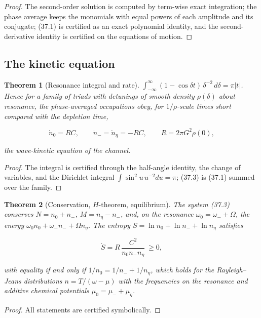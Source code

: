 \documentclass[11pt]{article}
\newtheorem{theorem}{Theorem}[section]
\theoremstyle{remark}
\begin{document}
\begin{proof}
The second-order solution is computed by term-wise exact
integration; the phase average keeps the monomials with equal
powers of each amplitude and its conjugate; (37.1) is certified as
an exact polynomial identity, and the second-derivative identity is
certified on the equations of motion.
\end{proof}

\subsection{The kinetic equation}

\begin{theorem}[Resonance integral and rate]
\label{thm:v20v34-rate}
\(\int_{-\infty}^\infty(1-\cos\delta t)\,\delta^{-2}\,d\delta=\pi|t|\).
Hence for a family of triads with detunings of smooth density
\(\rho(\delta)\) about resonance, the phase-averaged occupations obey,
for \(1/\rho\)-scale times short compared with the depletion time,

\[
 \dot n_0=RC,\qquad \dot n_-=\dot n_\eta=-RC,\qquad R=2\pi G^2\rho(0),
                                                                    \tag{37.3}
\]

the wave-kinetic equation of the channel.
\end{theorem}

\begin{proof}
The integral is certified through the half-angle identity, the
change of variables, and the Dirichlet integral
\(\int\sin^2u\,u^{-2}du=\pi\); (37.3) is (37.1) summed over the family.
\end{proof}

\begin{theorem}[Conservation, \(H\)-theorem, equilibrium]
\label{thm:v20v34-H}
The system (37.3) conserves \(N=n_0+n_-\), \(M=n_\eta-n_-\), and, on the
resonance \(\omega_0=\omega_-+\Omega\), the energy
\(\omega_0n_0+\omega_-n_-+\Omega n_\eta\).  The entropy
\(S=\ln n_0+\ln n_-+\ln n_\eta\) satisfies

\[
 \dot S=R\,\frac{C^2}{n_0n_-n_\eta}\ \ge0,                             \tag{37.4}
\]

with equality if and only if \(1/n_0=1/n_-+1/n_\eta\), which holds for
the Rayleigh--Jeans distributions \(n=T/(\omega-\mu)\) with the
frequencies on the resonance and additive chemical potentials
\(\mu_0=\mu_-+\mu_\eta\).
\end{theorem}

\begin{proof}
All statements are certified symbolically.
\end{proof}
\end{document}
